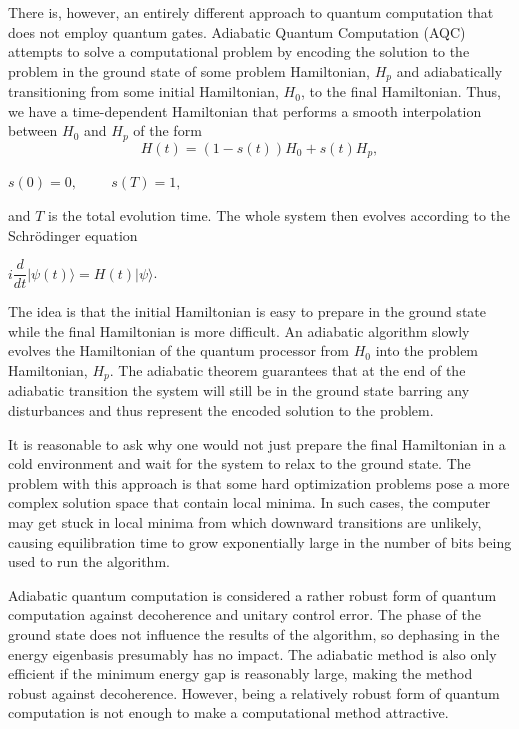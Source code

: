 \documentclass[%
 reprint,
 amsmath,amssymb,
 aps,
]{revtex4-1}
\begin{document}
   There is, however, an entirely different approach to quantum computation that does not employ quantum gates. Adiabatic Quantum Computation (AQC) attempts to solve a computational problem by encoding the solution to the problem in the ground state of some problem Hamiltonian, $H_p$ and adiabatically transitioning from some initial Hamiltonian, $H_0$, to the final Hamiltonian\cite{RevModPhys.90.015002}. Thus, we have a time-dependent Hamiltonian that performs a smooth interpolation between $H_0$ and $H_p$ of the form 
	\begin{equation}
		H(t) = (1-s(t))H_0 + s(t)H_p, 
		\label{eq:Ht}
	\end{equation}
	\begin{center}
		$s(0) = 0, \hspace{1cm} s(T) = 1,$
	\end{center}
and $T$ is the total evolution time. The whole system then evolves according to the Schr{\"o}dinger equation
 	\begin{center}
		$i\dfrac{d}{dt}\vert\psi(t)\rangle = H(t)\vert\psi\rangle$.
	\end{center}
	
   The idea is that the initial Hamiltonian is easy to prepare in the ground state while the final Hamiltonian is more difficult. An adiabatic algorithm slowly evolves the Hamiltonian of the quantum processor from $H_0$ into the problem Hamiltonian, $H_p$. The adiabatic theorem guarantees that at the end of the adiabatic transition the system will still be in the ground state barring any disturbances and thus represent the encoded solution to the problem. 
   
   It is reasonable to ask why one would not just prepare the final Hamiltonian in a cold environment and wait for the system to relax to the ground state. The problem with this approach is that some hard optimization problems pose a more complex solution space that contain local minima. In such cases, the computer may get stuck in local minima from which downward transitions are unlikely, causing equilibration time to grow exponentially large in the number of bits being used to run the algorithm.
   
   Adiabatic quantum computation is considered a rather robust form of quantum computation against decoherence and unitary control error. The phase of the ground state does not influence the results of the algorithm, so dephasing in the energy eigenbasis presumably has no impact. The adiabatic method is also only efficient if the minimum energy gap is reasonably large, making the method robust against decoherence\cite{Childs2001}. However, being a relatively robust form of quantum computation is not enough to make a computational method attractive. 
   
\end{document}
